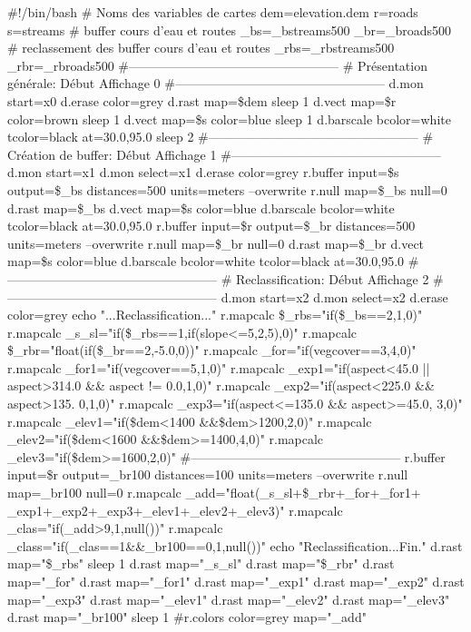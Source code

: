 \begin{smallverbatim}
#!/bin/bash
# Noms des variables de cartes
dem=elevation.dem
r=roads
s=streams
# buffer cours d'eau et routes
_bs=_bstreams500
_br=_broads500
# reclassement des buffer cours d'eau et routes
_rbs=_rbstreams500
_rbr=_rbroads500
#--------------------------------------------------
# Pr\'esentation g\'en\'erale: D\'ebut Affichage 0
#--------------------------------------------------
d.mon start=x0
d.erase color=grey
d.rast map=\$dem
sleep 1
d.vect map=\$r color=brown
sleep 1
d.vect map=\$s color=blue
sleep 1
d.barscale bcolor=white tcolor=black at=30.0,95.0
sleep 2
#--------------------------------------------------
# Cr\'eation de buffer: D\'ebut Affichage 1
#--------------------------------------------------
d.mon start=x1
d.mon select=x1
d.erase color=grey
r.buffer input=\$s output=\$_bs distances=500
 units=meters --overwrite
r.null map=\$_bs null=0
d.rast map=\$_bs
d.vect map=\$s color=blue
d.barscale bcolor=white tcolor=black at=30.0,95.0
r.buffer input=\$r output=\$_br distances=500
 units=meters --overwrite
r.null map=\$_br null=0
d.rast map=\$_br
d.vect map=\$s color=blue
d.barscale bcolor=white tcolor=black at=30.0,95.0
#--------------------------------------------------
# Reclassification: D\'ebut Affichage 2
#--------------------------------------------------
d.mon start=x2
d.mon select=x2
d.erase color=grey
echo "...Reclassification..."
r.mapcalc \$_rbs="if(\$_bs==2,1,0)"
r.mapcalc _s_sl="if(\$_rbs==1,if(slope<=5,2,5),0)"
r.mapcalc \$_rbr="float(if(\$_br==2,-5.0,0))"
r.mapcalc _for="if(vegcover==3,4,0)"
r.mapcalc _for1="if(vegcover==5,1,0)"
r.mapcalc _exp1="if(aspect<45.0 || aspect>314.0 &&
 aspect != 0.0,1,0)"
r.mapcalc _exp2="if(aspect<225.0 && aspect>135.
 0,1,0)"
r.mapcalc _exp3="if(aspect<=135.0 && aspect>=45.0,
 3,0)"
r.mapcalc _elev1="if(\$dem<1400 &&\$dem>1200,2,0)"
r.mapcalc _elev2="if(\$dem<1600 &&\$dem>=1400,4,0)"
r.mapcalc _elev3="if(\$dem>=1600,2,0)"
#--------------------------------------------------
r.buffer input=\$r output=_br100 distances=100
 units=meters --overwrite
r.null map=\_br100 null=0
r.mapcalc _add="float(_s_sl+\$_rbr+_for+_for1+
 _exp1+_exp2+_exp3+_elev1+_elev2+_elev3)"
r.mapcalc _clas="if(_add{>9,1,null())"
r.mapcalc _class="if(_clas==1&&_br100==0,1,null())"
echo "Reclassification...Fin."
d.rast map="\$_rbs"
sleep 1
d.rast map="_s_sl"
d.rast map="\$_rbr"
d.rast map="_for"
d.rast map="_for1"
d.rast map="_exp1"
d.rast map="_exp2"
d.rast map="_exp3"
d.rast map="_elev1"
d.rast map="_elev2"
d.rast map="_elev3"
d.rast map="_br100"
sleep 1
#r.colors color=grey map="_add"
}
\end{smallverbatim}
